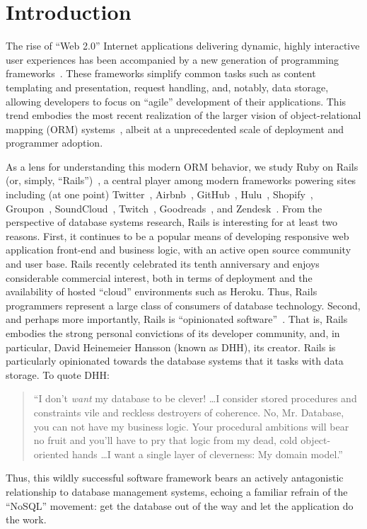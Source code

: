 
\section{Introduction}
\label{sec:intro}

The rise of ``Web 2.0'' Internet applications delivering dynamic,
highly interactive user experiences has been accompanied by a new
generation of programming frameworks~\cite{web20}. These frameworks
simplify common tasks such as content templating and presentation,
request handling, and, notably, data storage, allowing developers to
focus on ``agile'' development of their applications. This trend
embodies the most recent realization of the larger vision of
object-relational mapping (ORM) systems~\cite{orm-db}, albeit at a
unprecedented scale of deployment and programmer adoption.

As a lens for understanding this modern ORM behavior, we study Ruby on
Rails (or, simply, ``Rails'')~\cite{rails-book,rails-computer}, a
central player among modern frameworks powering sites including (at
one point) Twitter~\cite{twitter-rails}, Airbnb~\cite{airbnb-rails},
GitHub~\cite{github-rails}, Hulu~\cite{hulu-rails},
Shopify~\cite{shopify-rails}, Groupon~\cite{groupon-rails},
SoundCloud~\cite{soundcloud-rails}, Twitch~\cite{twitch-rails},
Goodreads~\cite{goodreads-rails}, and
Zendesk~\cite{zendesk-rails}. From the perspective of database systems
research, Rails is interesting for at least two reasons. First, it
continues to be a popular means of developing responsive web
application front-end and business logic, with an active open source
community and user base. Rails recently celebrated its tenth
anniversary and enjoys considerable commercial interest, both in terms
of deployment and the availability of hosted ``cloud'' environments
such as Heroku. Thus, Rails programmers represent a large class of
consumers of database technology. Second, and perhaps more
importantly, Rails is ``opinionated
software''~\cite{dhh-opinionated}. That is, Rails embodies the strong
personal convictions of its developer community, and, in particular,
David Heinemeier Hansson (known as DHH), its creator. Rails is particularly
opinionated towards the database systems that it tasks with data
storage. To quote DHH:
\begin{quote}
``I don't \textit{want} my database to be clever! \dots I consider stored procedures and constraints vile and reckless destroyers of coherence. No, Mr. Database, you can not have my business logic. Your procedural ambitions will bear no fruit and you'll have to pry that logic from my dead, cold object-oriented hands \dots I want a single layer of cleverness: My domain model.''~\cite{dhh-clever}
\end{quote}
Thus, this wildly successful software framework bears an actively
antagonistic relationship to database management systems, echoing a familiar refrain of the ``NoSQL'' movement: get the database out of the way and let the application do the work.

